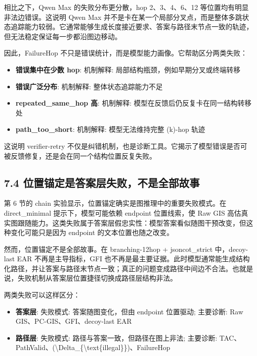 \documentclass[
  11pt,
]{article}
\providecommand{\tightlist}{%
  \setlength{\itemsep}{0pt}\setlength{\parskip}{0pt}}
\begin{document}
相比之下，Qwen Max 的失败分布更分散，hop 2、3、4、6、12
等位置均有明显非法边错误。这说明 Qwen Max
并不是卡在某一个局部分叉点，而是整体多跳状态追踪能力较弱。它通常能够生成长度接近要求、答案与路径末节点一致的轨迹，但无法稳定保证每一步都沿图边移动。

因此，FailureHop 不只是错误统计，而是模型能力画像。它帮助区分两类失败：

\begin{itemize}
\tightlist
\item
  \textbf{错误集中在少数 hop}: 机制解释:
  局部结构瓶颈，例如早期分叉或终端转移
\item
  \textbf{错误广泛分布}: 机制解释: 整体状态追踪能力不足
\item
  \textbf{repeated\_same\_hop 高}: 机制解释:
  模型在反馈后仍反复卡在同一结构转移处
\item
  \textbf{path\_too\_short}: 机制解释: 模型无法维持完整 (k)-hop 轨迹
\end{itemize}

这说明 verifier-retry
不仅是纠错机制，也是诊断工具。它揭示了模型错误是否可被反馈修复，还是会在同一个结构位置反复失败。

\subsection{7.4
位置锚定是答案层失败，不是全部故事}\label{ux4f4dux7f6eux951aux5b9aux662fux7b54ux6848ux5c42ux5931ux8d25ux4e0dux662fux5168ux90e8ux6545ux4e8b}

第 6 节的 chain 实验显示，位置锚定确实是图推理中的重要失败模式。在
direct\_minimal 提示下，模型可能依赖 endpoint 位置线索，使 Raw GIS
高估真实图跟随能力。这类失败属于答案层假忠实性：模型答案看似随图干预改变，但这种变化可能只是因为
endpoint 的文本位置也随之改变。

然而，位置锚定不是全部故事。在 branching-12hop + jsoncot\_strict
中，decoy-last EAR 不再是主导指标，GFI
也不再是最主要证据。此时模型通常能生成结构化路径，并让答案与路径末节点一致；真正的问题变成路径中间边不合法。也就是说，失败机制从答案层位置捷径切换成路径层结构非法。

两类失败可以这样区分：

\begin{itemize}
\tightlist
\item
  \textbf{答案层}: 失败模式: 答案随图变化，但由 endpoint 位置驱动;
  主要诊断: Raw GIS、PC-GIS、GFI、decoy-last EAR
\item
  \textbf{路径层}: 失败模式: 路径与答案一致，但路径在图上非法; 主要诊断:
  TAC、PathValid、(\textbackslash Delta\_\{\textbackslash text\{illegal\}\})、FailureHop
\end{itemize}
\end{document}
